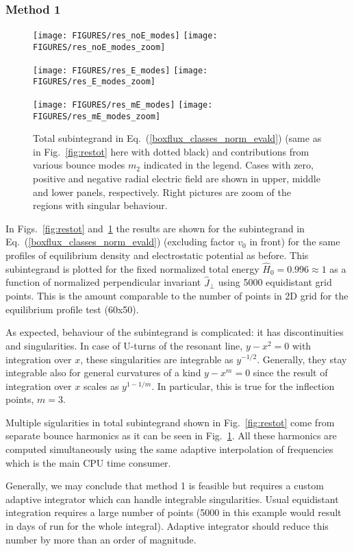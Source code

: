 \documentclass[preprint,prb,aps]{revtex4-1}
\newcommand{\eq}[1]{(\ref{#1})}
\begin{document}
\subsubsection{Method 1}
\label{sssec:one}
%
%
\begin{figure}[ht]
\centerline{
\texttt{[image: FIGURES/res\_noE\_modes]}
\texttt{[image: FIGURES/res\_noE\_modes\_zoom]}
}
\centerline{
\texttt{[image: FIGURES/res\_E\_modes]}
\texttt{[image: FIGURES/res\_E\_modes\_zoom]}
}
\centerline{
\texttt{[image: FIGURES/res\_mE\_modes]}
\texttt{[image: FIGURES/res\_mE\_modes\_zoom]}
}
\caption[]{
Total subintegrand in Eq.~\eq{boxflux_classes_norm_evald} 
(same as in Fig.~\ref{fig:restot} here with dotted black) and contributions
from various bounce modes $m_2$ indicated in the legend.
Cases with zero, positive and negative radial electric field are shown in upper,
middle and lower panels, respectively. Right pictures are zoom of the 
regions with singular behaviour.
}
\label{fig:restot_modes}
\end{figure}
%
%
In Figs.~\ref{fig:restot} and~\ref{fig:restot_modes} the results are shown for the
subintegrand in Eq.~\eq{boxflux_classes_norm_evald} (excluding factor $v_0$ in front)
for the same profiles of equilibrium density and electrostatic potential as before.
This subintegrand is plotted for the fixed normalized total energy 
$\hat H_0 = 0.996 \approx 1$ as a function of normalized perpendicular invariant
$\hat J_\perp$ using 5000 equidistant grid points. This is the amount comparable
to the number of points in 2D grid for the equilibrium profile test (60x50).

As expected, behaviour of the subintegrand is complicated: it has discontinuities 
and singularities. In case of U-turns of the resonant line, 
$y-x^2=0$ with integration over $x$, these singularities are integrable as $y^{-1/2}$.
Generally, they stay integrable also for general curvatures of a kind $y-x^m=0$
since the result of integration over $x$ scales as $y^{1-1/m}$. In particular, 
this is true for the inflection points, $m=3$.

Multiple sigularities in total subintegrand shown in Fig.~\ref{fig:restot}
come from separate bounce harmonics as it can be seen in Fig.~\ref{fig:restot_modes}.
All these harmonics are computed simultaneously using the same adaptive interpolation
of frequencies which is the main CPU time consumer.

Generally, we may conclude that method 1 is feasible but requires a custom adaptive
integrator which can handle integrable singularities. Usual equidistant integration
requires a large number of points (5000 in this example would result in days of run
for the whole integral). Adaptive integrator should reduce this number by more than 
an order of magnitude.
\end{document}
